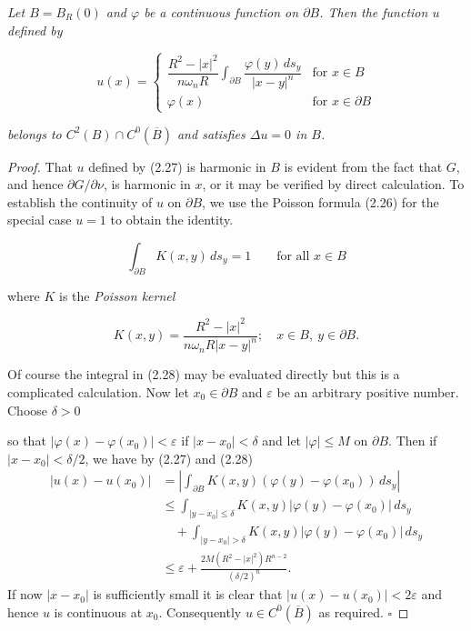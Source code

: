 \begin{theorem}\label{gt.thm2.6}
\textit{Let $B=B_R(0)$ and $\varphi$ be a continuous function on $\partial B$. Then the function $u$ defined by}

\begin{equation}
u(x)=
\begin{cases}
\dfrac{R^2-|x|^2}{n\omega_n R}\int_{\partial B}\dfrac{\varphi(y)\,d s_y}{|x-y|^n} & \text{for } x \in B \\[1.25ex]
\varphi(x) & \text{for } x \in \partial B
\end{cases}
\tag{2.27}
\end{equation}

\textit{belongs to $C^2(B)\cap C^0(\overline{B})$ and satisfies $\Delta u=0$ in $B$.}

\begin{proof}
That $u$ defined by (2.27) is harmonic in $B$ is evident from the fact that $G$, and hence $\partial G/\partial \nu$, is harmonic in $x$, or it may be verified by direct calculation. To establish the continuity of $u$ on $\partial B$, we use the Poisson formula (2.26) for the special case $u=1$ to obtain the identity.

\begin{equation}
\int_{\partial B}K(x,y)\,d s_y=1 \qquad \text{for all } x \in B
\tag{2.28}
\end{equation}

where $K$ is the \textit{Poisson kernel}

\begin{equation}
K(x,y)=\frac{R^2-|x|^2}{n\omega_n R|x-y|^n}; \quad x \in B,\ y \in \partial B.
\tag{2.29}
\end{equation}

Of course the integral in (2.28) may be evaluated directly but this is a complicated calculation. Now let $x_0 \in \partial B$ and $\varepsilon$ be an arbitrary positive number. Choose $\delta>0$



so that $|\varphi(x)-\varphi(x_0)|<\varepsilon$ if $|x-x_0|<\delta$ and let $|\varphi|\le M$ on $\partial B$. Then if $|x-x_0|<\delta/2$, we have by (2.27) and (2.28)
\[
\begin{aligned}
|u(x)-u(x_0)|
&= \left|\int_{\partial B} K(x,y)(\varphi(y)-\varphi(x_0))\,ds_y\right| \\
&\le \int_{|y-x_0|\le\delta} K(x,y)|\varphi(y)-\varphi(x_0)|\,ds_y \\
&\quad + \int_{|y-x_0|>\delta} K(x,y)|\varphi(y)-\varphi(x_0)|\,ds_y \\
&\le \varepsilon + \frac{2M(R^2-|x|^2)R^{n-2}}{(\delta/2)^n}.
\end{aligned}
\]
If now $|x-x_0|$ is sufficiently small it is clear that $|u(x)-u(x_0)|<2\varepsilon$ and hence $u$ is continuous at $x_0$. Consequently $u\in C^0(\overline{B})$ as required. $\square$
\end{proof}
\end{theorem}


